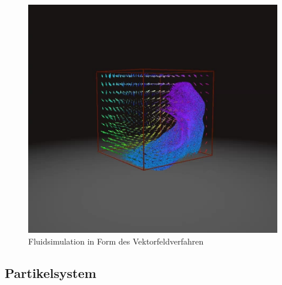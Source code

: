 \documentclass[intern,palatino]{cgBA}
\begin{document}
\begin{figure}[H]
	\centering
	\includegraphics[width=0.7\columnwidth]{Bilder/vektorfeld.jpg}
	\caption[Fluidsimulation in Form des Vektorfeldverfahren \newline Quelle:\url{https://thumbs.gfycat.com/CelebratedElasticHartebeest-poster.jpg}]{Fluidsimulation in Form des Vektorfeldverfahren}
	\label{img:Vertexfeld}
\end{figure}


\subsection{Partikelsystem}\label{partikel}
\end{document}
